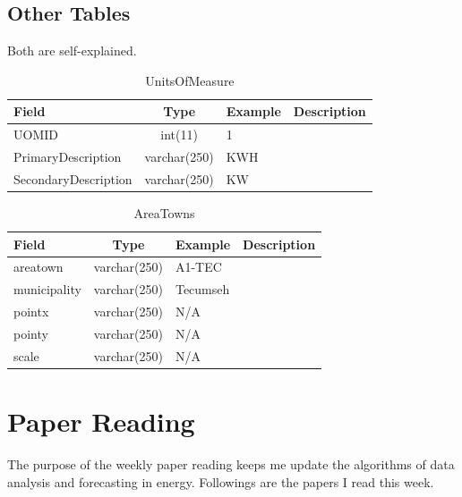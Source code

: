 \documentclass[a4paper,12pt]{llncs}
\begin{document}
\newpage
\subsection{Other Tables}
Both are self-explained.
\begin{table}[htp]
\centering
\caption{UnitsOfMeasure}
\begin{tabular}{|l|c|l|p{8.6cm}|}
 \hline
 {\bf Field}       & {\bf Type} & {\bf Example}     & {\bf Description } \\ \hline
UOMID               & int(11)     & 1 &   \\ \hline
PrimaryDescription  & varchar(250)&KWH  &   \\ \hline
SecondaryDescription& varchar(250)&KW  &   \\ \hline
\end{tabular}
\end{table}
\begin{table}[H]
\caption{AreaTowns}
\begin{tabular}{|l|c|l|p{10cm}|}
 \hline
 {\bf Field}       & {\bf Type} & {\bf Example}     & {\bf Description } \\ \hline
areatown    & varchar(250)& A1-TEC &   \\ \hline
municipality& varchar(250)& Tecumseh &   \\ \hline
pointx      & varchar(250)& N/A &   \\ \hline
pointy      & varchar(250)& N/A &   \\ \hline
scale       & varchar(250)& N/A &   \\ \hline
\end{tabular}
\end{table}



\newpage
\section{Paper Reading}
The purpose of the weekly paper reading keeps me update the algorithms of data analysis and forecasting in energy. Followings are the papers I read this week.
\end{document}
